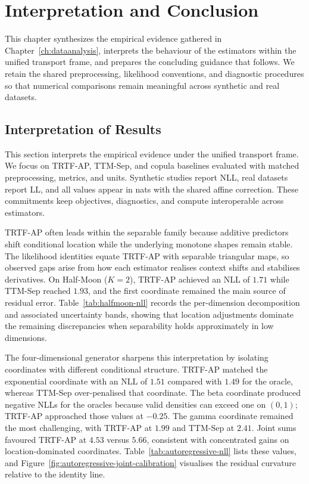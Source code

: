 \documentclass[11pt,a4paper,twoside]{book}\usepackage[]{graphicx}\usepackage[]{xcolor}
\begin{document}
\chapter{Interpretation and Conclusion}\label{ch:conclusion}

This chapter synthesizes the empirical evidence gathered in Chapter~\ref{ch:dataanalysis}, interprets the behaviour of the estimators within the unified transport frame, and prepares the concluding guidance that follows. We retain the shared preprocessing, likelihood conventions, and diagnostic procedures so that numerical comparisons remain meaningful across synthetic and real datasets.

\section{Interpretation of Results}\label{sec:interpretation-results}
This section interprets the empirical evidence under the unified transport frame. We focus on TRTF-AP, TTM-Sep, and copula baselines evaluated with matched preprocessing, metrics, and units. Synthetic studies report NLL, real datasets report LL, and all values appear in nats with the shared affine correction. These commitments keep objectives, diagnostics, and compute interoperable across estimators.

TRTF-AP often leads within the separable family because additive predictors shift conditional location while the underlying monotone shapes remain stable. The likelihood identities equate TRTF-AP with separable triangular maps, so observed gaps arise from how each estimator realises context shifts and stabilises derivatives. On Half-Moon ($K=2$), TRTF-AP achieved an NLL of $1.71$ while TTM-Sep reached $1.93$, and the first coordinate remained the main source of residual error. Table~\ref{tab:halfmoon-nll} records the per-dimension decomposition and associated uncertainty bands, showing that location adjustments dominate the remaining discrepancies when separability holds approximately in low dimensions.

The four-dimensional generator sharpens this interpretation by isolating coordinates with different conditional structure. TRTF-AP matched the exponential coordinate with an NLL of $1.51$ compared with $1.49$ for the oracle, whereas TTM-Sep over-penalised that coordinate. The beta coordinate produced negative NLLs for the oracles because valid densities can exceed one on $(0,1)$; TRTF-AP approached those values at $-0.25$. The gamma coordinate remained the most challenging, with TRTF-AP at $1.99$ and TTM-Sep at $2.41$. Joint sums favoured TRTF-AP at $4.53$ versus $5.66$, consistent with concentrated gains on location-dominated coordinates. Table~\ref{tab:autoregressive-nll} lists these values, and Figure~\ref{fig:autoregressive-joint-calibration} visualises the residual curvature relative to the identity line.
\end{document}
